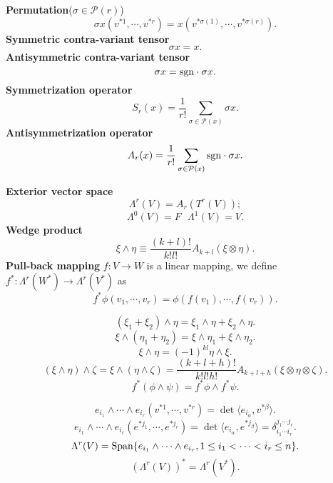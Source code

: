 \begin{newdef}
\textbf{Permutation}($\sigma \in \mathcal{P}(r)$)
\[\sigma x(v^{*1},\cdots,v^{*r})=x(v^{*\sigma(1)},\cdots,v^{*\sigma(r)}).\]
\textbf{Symmetric contra-variant tensor}
\[\sigma x =x.\]
\textbf{Antisymmetric contra-variant tensor}
\[\sigma x ={\rm sgn } \cdot \sigma x.\]
\textbf{Symmetrization operator}
\[S_r(x) = \frac{1}{r!} \sum_{\sigma \in \mathcal{P}(x)} \sigma x.\]
\textbf{Antisymmetrization operator}
\[A_r(x) = \frac{1}{r!} \sum_{\sigma \in \mathcal{P}(x)} {\rm sgn }\cdot \sigma x.\]
\end{newdef}

\begin{newdef}
\textbf{Exterior vector space}
\[\Lambda^r(V) = A_r(T^r(V));\]
\[\Lambda^0(V)=F \ \ \ \Lambda^1(V)=V.\]
\textbf{Wedge product}
\[\xi \wedge \eta \equiv \frac{(k+l)!}{k!l!}A_{k+l}(\xi \otimes \eta).\]
\textbf{Pull-back mapping}
$f:V \to W$ is a linear mapping, we define $f^*:\Lambda^r(W^*) \to \Lambda^r(V^*)$ as
\[f^* \phi(v_1,\cdots,v_r) = \phi(f(v_1),\cdots,f(v_r)).\]
\end{newdef}

\begin{newprop}
\[(\xi_1+\xi_2) \wedge \eta = \xi_1 \wedge \eta + \xi_2 \wedge \eta.\]
\[\xi \wedge (\eta_1+\eta_2) = \xi \wedge \eta_1 + \xi \wedge \eta_2.\]
\[\xi \wedge \eta = (-1)^{kl} \eta \wedge \xi.\]
\[(\xi \wedge \eta) \wedge \zeta = \xi \wedge (\eta \wedge \zeta) = \frac{(k+l+h)!}{k!l!h!}A_{k+l+h}(\xi \otimes \eta \otimes \zeta).\]
\[f^*(\phi \wedge \psi) = f^*\phi \wedge f^*\psi.\]
\end{newprop}

\begin{newprop}
\[e_{i_1} \wedge \cdots \wedge e_{i_r}(v^{*1},\cdots,v^{*r}) = \det \langle e_{i_{\alpha}},v^{*\beta} \rangle.\]
\[e_{i_1} \wedge \cdots \wedge e_{i_r}(e^{*j_1},\cdots,e^{*j_r}) = \det \langle e_{i_{\alpha}},e^{*j_{\beta}} \rangle = \delta^{j_1 \cdots j_r}_{i_1 \cdots i_r}.\]
\[\Lambda^r(V) = {\rm Span }\{e_{i_1} \wedge \cdots \wedge e_{i_r},1\leq i_1 < \cdots < i_r \leq n  \}.\]
\[(\Lambda^r(V))^* = \Lambda^r(V^*).\]
\end{newprop}

